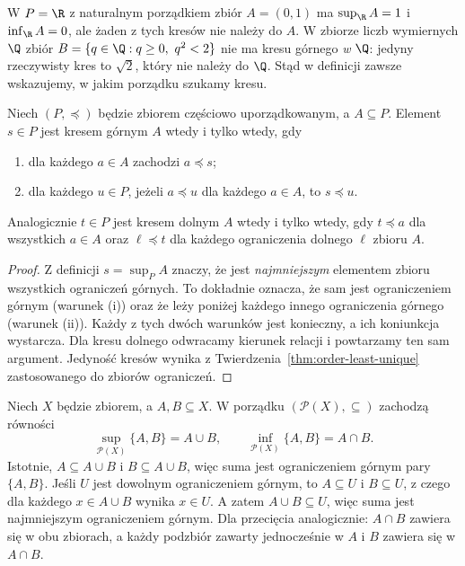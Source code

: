 \begin{uwaga}
W $P=\R$ z naturalnym porządkiem zbiór
$A=(0,1)$ ma $\sup_{\R}A=1$ i $\inf_{\R}A=0$,
ale żaden z tych kresów nie należy do $A$.
W zbiorze liczb wymiernych $\Q$ zbiór
$B=\{q\in\Q:q\ge0,\ q^2<2\}$ nie ma kresu górnego
\emph{w $\Q$}: jedyny rzeczywisty kres to $\sqrt2$,
który nie należy do $\Q$. Stąd w definicji zawsze
wskazujemy, w jakim porządku szukamy kresu.
\end{uwaga}

\begin{twierdzenie}\label{thm:sup-characterization}
Niech $(P,\preceq)$ będzie zbiorem częściowo uporządkowanym,
a $A\subseteq P$. Element $s\in P$ jest kresem górnym $A$
wtedy i tylko wtedy, gdy
\begin{enumerate}[label=(\roman*)]
\item dla każdego $a\in A$ zachodzi $a\preceq s$;
\item dla każdego $u\in P$, jeżeli $a\preceq u$ dla każdego
$a\in A$, to $s\preceq u$.
\end{enumerate}
Analogicznie $t\in P$ jest kresem dolnym $A$ wtedy
i tylko wtedy, gdy $t\preceq a$ dla wszystkich $a\in A$
oraz $\ell\preceq t$ dla każdego ograniczenia dolnego
$\ell$ zbioru $A$.
\end{twierdzenie}
\begin{proof}
Z definicji $s=\sup_P A$ znaczy, że jest
\emph{najmniejszym} elementem zbioru wszystkich ograniczeń
górnych. To dokładnie oznacza, że sam jest ograniczeniem
górnym (warunek (i)) oraz że leży poniżej każdego innego
ograniczenia górnego (warunek (ii)). Każdy z tych dwóch
warunków jest konieczny, a ich koniunkcja wystarcza.
Dla kresu dolnego odwracamy kierunek relacji i powtarzamy
ten sam argument. Jedyność kresów wynika z
Twierdzenia~\ref{thm:order-least-unique} zastosowanego
do zbiorów ograniczeń.
\end{proof}

\begin{przyklad}\label{ex:orders-sets-lattice}
Niech $X$ będzie zbiorem, a $A,B\subseteq X$. W porządku
$(\mathcal P(X),\subseteq)$ zachodzą równości
\[
 \sup_{\mathcal P(X)}\{A,B\}=A\cup B,\qquad
 \inf_{\mathcal P(X)}\{A,B\}=A\cap B.
\]
Istotnie, $A\subseteq A\cup B$ i $B\subseteq A\cup B$,
więc suma jest ograniczeniem górnym pary $\{A,B\}$.
Jeśli $U$ jest dowolnym ograniczeniem górnym, to
$A\subseteq U$ i $B\subseteq U$, z czego dla każdego
$x\in A\cup B$ wynika $x\in U$. A zatem
$A\cup B\subseteq U$, więc suma jest najmniejszym
ograniczeniem górnym. Dla przecięcia analogicznie:
$A\cap B$ zawiera się w obu zbiorach, a każdy
podzbiór zawarty jednocześnie w $A$ i $B$ zawiera się
w $A\cap B$.
\end{przyklad}

